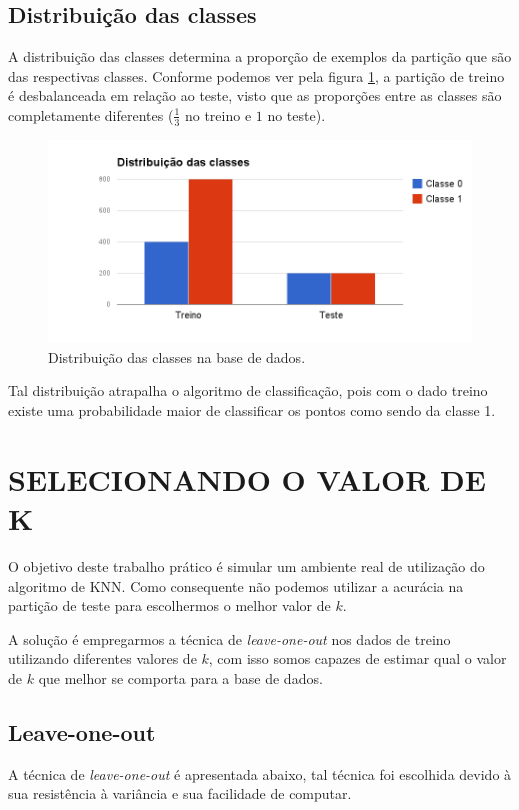 \documentclass[a4paper, 11 pt, onecolumn]{article}   %
\begin{document}
\subsection{Distribuição das classes}

A distribuição das classes determina a proporção de exemplos da partição que são das respectivas classes.
Conforme podemos ver pela figura \ref{fig:distclasses}, a partição de treino é desbalanceada em relação ao teste, visto que as proporções entre as classes são completamente diferentes ($\frac{1}{3}$ no treino e $1$ no teste).

\begin{figure}[htp!]
\hspace{-3.5cm}
 \includegraphics[scale=0.6]{imagens/chart_1.png}
  \caption{Distribuição das classes na base de dados. \label{fig:distclasses}}
\end{figure}

Tal distribuição atrapalha o algoritmo de classificação, pois com o dado treino existe uma probabilidade maior de classificar os pontos como sendo da classe 1.

\section{SELECIONANDO O VALOR DE K}
\label{valork}
O objetivo deste trabalho prático é simular um ambiente real de utilização do algoritmo de KNN. 
Como consequente não podemos utilizar a acurácia na partição de teste para escolhermos o melhor valor de $k$.

A solução é empregarmos a técnica de \textit{leave-one-out} nos dados de treino utilizando diferentes valores de $k$, com isso somos capazes de estimar qual o valor de $k$ que melhor se comporta para a base de dados.

\subsection{Leave-one-out}
A técnica de \textit{leave-one-out} é apresentada abaixo, tal técnica foi escolhida devido à sua resistência à variância e sua facilidade de computar.
\end{document}
